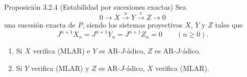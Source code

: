 \begin{statement}{Proposición 3.2.4 (Estabilidad por sucesiones exactas)}
Sea
\[
0\longrightarrow X\stackrel{u}{\longrightarrow}Y\stackrel{v}{\longrightarrow}Z\longrightarrow0
\]
una sucesión exacta de $P$, siendo los sistemas proyectivos $X$, $Y$ y $Z$ tales que
\[
J^{n+1}X_n=J^{n+1}Y_n=J^{n+1}Z_n=0\qquad(n\ge0).
\]
\begin{enumerate}[label=(\roman*)]
\item Si $X$ verifica (MLAR) e $Y$ es AR-$J$-ádico, $Z$ es AR-$J$-ádico.
\item Si $Y$ verifica (MLAR) y $Z$ es AR-$J$-ádico, $X$ verifica (MLAR).
\end{enumerate}
\end{statement}

